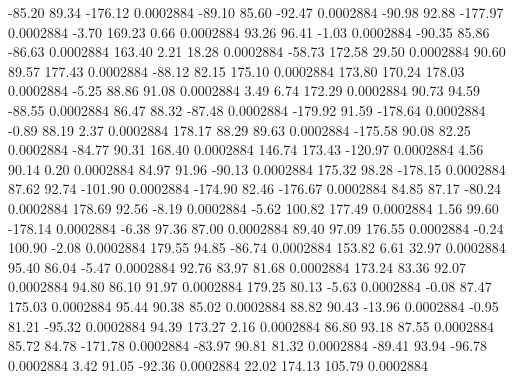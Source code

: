      -85.20       89.34     -176.12     0.0002884
      -89.10       85.60      -92.47     0.0002884
      -90.98       92.88     -177.97     0.0002884
       -3.70      169.23        0.66     0.0002884
       93.26       96.41       -1.03     0.0002884
      -90.35       85.86      -86.63     0.0002884
      163.40        2.21       18.28     0.0002884
      -58.73      172.58       29.50     0.0002884
       90.60       89.57      177.43     0.0002884
      -88.12       82.15      175.10     0.0002884
      173.80      170.24      178.03     0.0002884
       -5.25       88.86       91.08     0.0002884
        3.49        6.74      172.29     0.0002884
       90.73       94.59      -88.55     0.0002884
       86.47       88.32      -87.48     0.0002884
     -179.92       91.59     -178.64     0.0002884
       -0.89       88.19        2.37     0.0002884
      178.17       88.29       89.63     0.0002884
     -175.58       90.08       82.25     0.0002884
      -84.77       90.31      168.40     0.0002884
      146.74      173.43     -120.97     0.0002884
        4.56       90.14        0.20     0.0002884
       84.97       91.96      -90.13     0.0002884
      175.32       98.28     -178.15     0.0002884
       87.62       92.74     -101.90     0.0002884
     -174.90       82.46     -176.67     0.0002884
       84.85       87.17      -80.24     0.0002884
      178.69       92.56       -8.19     0.0002884
       -5.62      100.82      177.49     0.0002884
        1.56       99.60     -178.14     0.0002884
       -6.38       97.36       87.00     0.0002884
       89.40       97.09      176.55     0.0002884
       -0.24      100.90       -2.08     0.0002884
      179.55       94.85      -86.74     0.0002884
      153.82        6.61       32.97     0.0002884
       95.40       86.04       -5.47     0.0002884
       92.76       83.97       81.68     0.0002884
      173.24       83.36       92.07     0.0002884
       94.80       86.10       91.97     0.0002884
      179.25       80.13       -5.63     0.0002884
       -0.08       87.47      175.03     0.0002884
       95.44       90.38       85.02     0.0002884
       88.82       90.43      -13.96     0.0002884
       -0.95       81.21      -95.32     0.0002884
       94.39      173.27        2.16     0.0002884
       86.80       93.18       87.55     0.0002884
       85.72       84.78     -171.78     0.0002884
      -83.97       90.81       81.32     0.0002884
      -89.41       93.94      -96.78     0.0002884
        3.42       91.05      -92.36     0.0002884
       22.02      174.13      105.79     0.0002884
